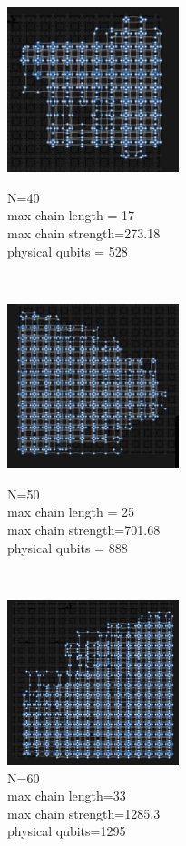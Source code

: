 \documentclass[oneside,a4paper]{article}
\begin{document}
\begin{figure}[htp]
\begin{minipage}[b]{4.5cm}
\centering
\includegraphics[width=5cm]{LaTeXTemplate/Images/2000QN40.png}
\caption{N=40\\max chain length = 17\\max chain strength=273.18\\physical qubits = 528}
\end{minipage}
\ \hspace{2mm} \hspace{2mm} \
\begin{minipage}[b]{4.5cm}
\centering
\includegraphics[width=5cm]{LaTeXTemplate/Images/2000QN50.png}
\caption{N=50\\max chain length = 25\\max chain strength=701.68\\physical qubits = 888}
\end{minipage}
\ \hspace{2mm} \hspace{2mm} \
\begin{minipage}[b]{4.5cm}
\centering
\includegraphics[width=5cm]{LaTeXTemplate/Images/2000QN60.png}
\caption{N=60\\max chain length=33\\max chain strength=1285.3\\physical qubits=1295}
\end{minipage}
\end{figure}
\end{document}
